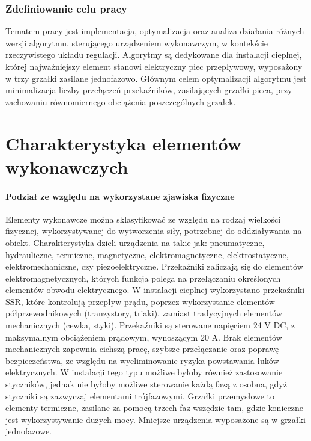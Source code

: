 \documentclass[a4paper,twoside,12pt]{book}
\begin{document}
\subsection{Zdefiniowanie celu pracy}
Tematem pracy jest implementacja, optymalizacja oraz analiza działania różnych wersji algorytmu, sterującego urządzeniem wykonawczym, w kontekście rzeczywistego układu regulacji. Algorytmy są dedykowane dla instalacji cieplnej, której najważniejszy element stanowi elektryczny piec przepływowy, wyposażony w trzy grzałki zasilane jednofazowo. Głównym celem optymalizacji algorytmu jest minimalizacja liczby przełączeń przekaźników, zasilających grzałki pieca, przy zachowaniu równomiernego obciążenia poszczególnych grzałek.

\chapter{Charakterystyka elementów wykonawczych}
\label{ch:02}
\subsubsection{Podział ze względu na wykorzystane zjawiska fizyczne}
Elementy wykonawcze można sklasyfikować ze względu na rodzaj wielkości fizycznej, wykorzystywanej do wytworzenia siły, potrzebnej do oddziaływania na obiekt. Charakterystyka dzieli urządzenia na takie jak: pneumatyczne, hydrauliczne, termiczne, magnetyczne, elektromagnetyczne, elektrostatyczne, elektromechaniczne, czy piezoelektryczne. Przekaźniki zaliczają się do elementów elektromagnetycznych, których funkcja polega na przełączaniu określonych elementów obwodu elektrycznego. W instalacji cieplnej wykorzystano przekaźniki SSR, które kontrolują przepływ prądu, poprzez wykorzystanie elementów półprzewodnikowych (tranzystory, triaki), zamiast tradycyjnych elementów mechanicznych (cewka, styki). Przekaźniki są sterowane napięciem 24 V DC, z maksymalnym obciążeniem prądowym, wynoszącym 20 A. Brak elementów mechanicznych zapewnia cichszą pracę, szybsze przełączanie oraz poprawę bezpieczeństwa, ze względu na wyeliminowanie ryzyka powstawania łuków elektrycznych. W instalacji tego typu możliwe byłoby również zastosowanie styczników, jednak nie byłoby możliwe sterowanie każdą fazą z osobna, gdyż styczniki są zazwyczaj elementami trójfazowymi. Grzałki przemysłowe to elementy termiczne, zasilane za pomocą trzech faz wszędzie tam, gdzie konieczne jest wykorzystywanie dużych mocy. Mniejsze urządzenia wyposażone są w grzałki jednofazowe.
\end{document}
